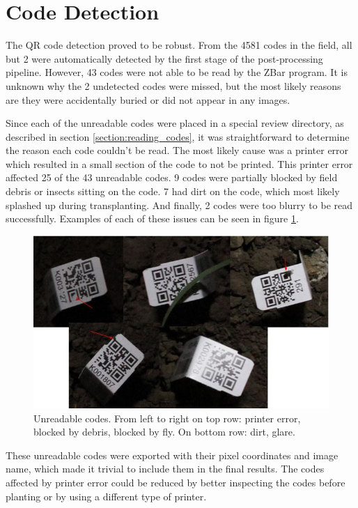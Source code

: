 \section{Code Detection}

The QR code detection proved to be robust. From the 4581 codes in the field, all but 2 were automatically detected by the first stage of the post-processing pipeline.  However, 43 codes were not able to be read by the ZBar program.  It is unknown why the 2 undetected codes were missed, but the most likely reasons are they were accidentally buried or did not appear in any images.  

Since each of the unreadable codes were placed in a special review directory, as described in section \ref{section:reading_codes}, it was straightforward to determine the reason each code couldn't be read.  The most likely cause was a printer error which resulted in a small section of the code to not be printed.  This printer error affected 25 of the 43 unreadable codes.  9 codes were partially blocked by field debris or insects sitting on the code.  7 had dirt on the code, which most likely splashed up during transplanting. And finally, 2 codes were too blurry to be read successfully.  Examples of each of these issues can be seen in figure \ref{figure:missed_codes}. 

\begin{figure}[htb]
	\centering
    \includegraphics[width=5in]{figures/missed_codes.jpg}
    \caption[Missed QR Codes]{Unreadable codes.  From left to right on top row: printer error, blocked by debris, blocked by fly. On bottom row: dirt, glare.}
    \label{figure:missed_codes}
\end{figure}

These unreadable codes were exported with their pixel coordinates and image name, which made it trivial to include them in the final results. The codes affected by printer error could be reduced by better inspecting the codes before planting or by using a different type of printer.

